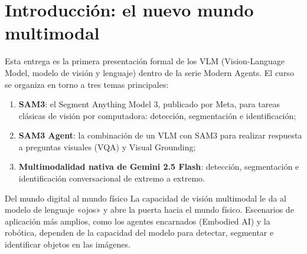 \section{Introducción: el nuevo mundo multimodal}

Esta entrega es la primera presentación formal de los VLM (Vision-Language Model, modelo de visión y lenguaje) dentro de la serie Modern Agents. El curso se organiza en torno a tres temas principales:

\begin{enumerate}
    \item \textbf{SAM3}: el Segment Anything Model 3, publicado por Meta, para tareas clásicas de visión por computadora: detección, segmentación e identificación;
    \item \textbf{SAM3 Agent}: la combinación de un VLM con SAM3 para realizar respuesta a preguntas visuales (VQA) y Visual Grounding;
    \item \textbf{Multimodalidad nativa de Gemini 2.5 Flash}: detección, segmentación e identificación conversacional de extremo a extremo.
\end{enumerate}

\begin{knowledgebox}{Del mundo digital al mundo físico}
La capacidad de visión multimodal le da al modelo de lenguaje «ojos» y abre la puerta hacia el mundo físico. Escenarios de aplicación más amplios, como los agentes encarnados (Embodied AI) y la robótica, dependen de la capacidad del modelo para detectar, segmentar e identificar objetos en las imágenes.
\end{knowledgebox}

